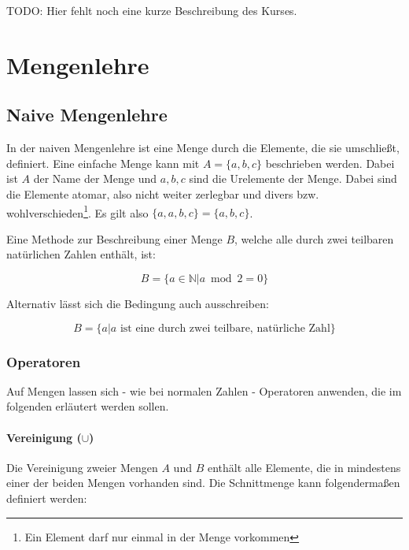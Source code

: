\documentclass[../main.tex]{subfiles}
\begin{document}
    TODO: Hier fehlt noch eine kurze Beschreibung des Kurses.
    \clearpage

    \section{Mengenlehre}
    	\subsection{Naive Mengenlehre}
    	    In der naiven Mengenlehre ist eine Menge durch die Elemente, die sie umschließt, definiert.
            Eine einfache Menge kann mit $A = \{a, b, c\}$ beschrieben werden. Dabei ist $A$ der Name der Menge und $a, b, c$ sind die Urelemente der Menge. Dabei sind die Elemente atomar, also nicht weiter zerlegbar und divers bzw. wohlverschieden\footnote{Ein Element darf nur einmal in der Menge vorkommen}. Es gilt also $\{a, a, b, c\} = \{a, b, c\}$.
            
            Eine Methode zur Beschreibung einer Menge $B$, welche alle durch zwei teilbaren natürlichen Zahlen enthält, ist:
            
            \begin{equation}
                B = \{a \in \mathbb{N} | a \bmod 2 = 0\}
            \end{equation}
            
            Alternativ lässt sich die Bedingung auch ausschreiben:
            
            \begin{equation}
            	B = \{a | a \text{ ist eine durch zwei teilbare, natürliche Zahl}\}
            \end{equation}
            
            \subsubsection{Operatoren}
                Auf Mengen lassen sich - wie bei normalen Zahlen - Operatoren anwenden, die im folgenden erläutert werden sollen.
                
                \paragraph{Vereinigung ($\cup$)}
                    Die Vereinigung zweier Mengen $A$ und $B$ enthält alle Elemente, die in mindestens einer der beiden Mengen vorhanden sind. Die Schnittmenge kann folgendermaßen definiert werden:
                    
\end{document}

